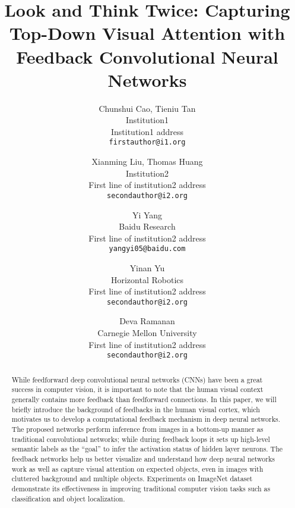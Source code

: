 \documentclass[10pt,twocolumn,letterpaper]{article}
\begin{document}
\title{Look and Think Twice: Capturing Top-Down Visual Attention with Feedback Convolutional Neural Networks}

\author{Chunshui Cao, Tieniu Tan\\
Institution1\\
Institution1 address\\
{\tt\small firstauthor@i1.org}
\and
Xianming Liu, Thomas Huang\\
Institution2\\
First line of institution2 address\\
{\tt\small secondauthor@i2.org}
\and
Yi Yang\\
Baidu Research\\
First line of institution2 address\\
{\tt\small yangyi05@baidu.com}
\and
Yinan Yu\\
Horizontal Robotics\\
First line of institution2 address\\
{\tt\small secondauthor@i2.org}
\and
Deva Ramanan\\
Carnegie Mellon University\\
First line of institution2 address\\
{\tt\small secondauthor@i2.org}
}

\maketitle


\begin{abstract}
While feedforward deep convolutional neural networks (CNNs) have been a great success in computer vision, it is important to note that the human visual context generally contains more feedback than feedforward connections.
In this paper, we will briefly introduce the background of feedbacks in the human visual cortex, which motivates us to develop a computational feedback mechanism in deep neural networks.
The proposed networks perform inference from images in a bottom-up manner as traditional convolutional networks; while during feedback loops it sets up high-level semantic labels as the “goal” to infer the activation status of hidden layer neurons.
The feedback networks help us better visualize and understand how deep neural networks work as well as capture visual attention on expected objects, even in images with cluttered background and multiple objects.
Experiments on ImageNet dataset demonstrate its effectiveness in improving traditional computer vision tasks such as classification and object localization.
\end{abstract}







{\small


}
\end{document}
